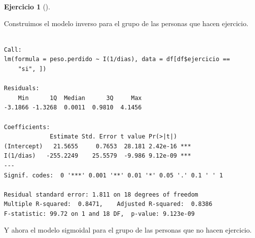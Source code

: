 \documentclass[
  a4paper,
]{scrreport}
\newenvironment{Shaded}{\begin{snugshade}}{\end{snugshade}}
\newcommand{\DecValTok}[1]{\textcolor[rgb]{0.68,0.00,0.00}{#1}}
\newcommand{\FunctionTok}[1]{\textcolor[rgb]{0.28,0.35,0.67}{#1}}
\newcommand{\NormalTok}[1]{\textcolor[rgb]{0.00,0.23,0.31}{#1}}
\newcommand{\OtherTok}[1]{\textcolor[rgb]{0.00,0.23,0.31}{#1}}
\newcommand{\SpecialCharTok}[1]{\textcolor[rgb]{0.37,0.37,0.37}{#1}}
\newcommand{\StringTok}[1]{\textcolor[rgb]{0.13,0.47,0.30}{#1}}
\theoremstyle{definition}
\newtheorem{exercise}{Ejercicio}[chapter]
\theoremstyle{remark}
\begin{document}
\begin{exercise}[]
\begin{enumerate}
  \begin{tcolorbox}[enhanced jigsaw, breakable, toptitle=1mm, colbacktitle=quarto-callout-tip-color!10!white, rightrule=.15mm, opacityback=0, opacitybacktitle=0.6, titlerule=0mm, coltitle=black, colframe=quarto-callout-tip-color-frame, colback=white, bottomtitle=1mm, leftrule=.75mm, toprule=.15mm, title=\textcolor{quarto-callout-tip-color}{\faLightbulb}\hspace{0.5em}{Solución}, arc=.35mm, bottomrule=.15mm, left=2mm]

  Construimos el modelo inverso para el grupo de las personas que hacen
  ejercicio.

\begin{Shaded}
\end{Shaded}

\begin{verbatim}

Call:
lm(formula = peso.perdido ~ I(1/dias), data = df[df$ejercicio == 
    "si", ])

Residuals:
    Min      1Q  Median      3Q     Max 
-3.1866 -1.3268  0.0011  0.9810  4.1456 

Coefficients:
             Estimate Std. Error t value Pr(>|t|)    
(Intercept)   21.5655     0.7653  28.181 2.42e-16 ***
I(1/dias)   -255.2249    25.5579  -9.986 9.12e-09 ***
---
Signif. codes:  0 '***' 0.001 '**' 0.01 '*' 0.05 '.' 0.1 ' ' 1

Residual standard error: 1.811 on 18 degrees of freedom
Multiple R-squared:  0.8471,    Adjusted R-squared:  0.8386 
F-statistic: 99.72 on 1 and 18 DF,  p-value: 9.123e-09
\end{verbatim}

  Y ahora el modelo sigmoidal para el grupo de las personas que no hacen
  ejercicio.

\begin{Shaded}
\end{Shaded}


\end{tcolorbox}
\end{enumerate}
\end{exercise}
\end{document}
